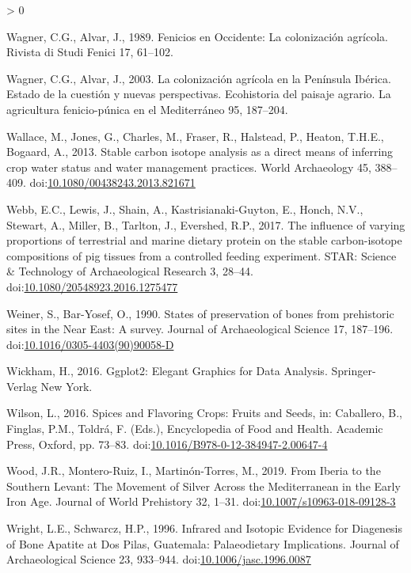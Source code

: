 \documentclass[5p]{elsarticle} %
\newlength{\cslhangindent}
\newenvironment{CSLReferences}[2] %
 {%
  \setlength{\parindent}{0pt}
  \ifodd #1 \everypar{\setlength{\hangindent}{\cslhangindent}}\ignorespaces\fi
  \ifnum #2 > 0
  \setlength{\parskip}{#2\baselineskip}
  \fi
 }%
 {}
\begin{document}
\begin{CSLReferences}{1}{0}
\leavevmode\hypertarget{ref-wagner_alvar89}{}%
Wagner, C.G., Alvar, J., 1989. Fenicios en {Occidente}: La colonización agrícola. Rivista di Studi Fenici 17, 61--102.

\leavevmode\hypertarget{ref-wagner_alvar03}{}%
Wagner, C.G., Alvar, J., 2003. La colonización agrícola en la {Península Ibérica}. {Estado} de la cuestión y nuevas perspectivas. Ecohistoria del paisaje agrario. La agricultura fenicio-púnica en el Mediterráneo 95, 187--204.

\leavevmode\hypertarget{ref-wallace_etal13}{}%
Wallace, M., Jones, G., Charles, M., Fraser, R., Halstead, P., Heaton, T.H.E., Bogaard, A., 2013. Stable carbon isotope analysis as a direct means of inferring crop water status and water management practices. World Archaeology 45, 388--409. doi:\href{https://doi.org/10.1080/00438243.2013.821671}{10.1080/00438243.2013.821671}

\leavevmode\hypertarget{ref-webb_etal17a}{}%
Webb, E.C., Lewis, J., Shain, A., Kastrisianaki-Guyton, E., Honch, N.V., Stewart, A., Miller, B., Tarlton, J., Evershed, R.P., 2017. The influence of varying proportions of terrestrial and marine dietary protein on the stable carbon-isotope compositions of pig tissues from a controlled feeding experiment. STAR: Science \& Technology of Archaeological Research 3, 28--44. doi:\href{https://doi.org/10.1080/20548923.2016.1275477}{10.1080/20548923.2016.1275477}

\leavevmode\hypertarget{ref-weiner_bar-yosef90}{}%
Weiner, S., Bar-Yosef, O., 1990. States of preservation of bones from prehistoric sites in the {Near East}: {A} survey. Journal of Archaeological Science 17, 187--196. doi:\href{https://doi.org/10.1016/0305-4403(90)90058-D}{10.1016/0305-4403(90)90058-D}

\leavevmode\hypertarget{ref-wickham16}{}%
Wickham, H., 2016. Ggplot2: {Elegant Graphics} for {Data Analysis}. {Springer-Verlag New York}.

\leavevmode\hypertarget{ref-wilson16}{}%
Wilson, L., 2016. Spices and {Flavoring Crops}: {Fruits} and {Seeds}, in: Caballero, B., Finglas, P.M., Toldrá, F. (Eds.), Encyclopedia of {Food} and {Health}. {Academic Press}, {Oxford}, pp. 73--83. doi:\href{https://doi.org/10.1016/B978-0-12-384947-2.00647-4}{10.1016/B978-0-12-384947-2.00647-4}

\leavevmode\hypertarget{ref-wood_etal19}{}%
Wood, J.R., Montero-Ruiz, I., Martinón-Torres, M., 2019. From {Iberia} to the {Southern Levant}: {The Movement} of {Silver Across} the {Mediterranean} in the {Early Iron Age}. Journal of World Prehistory 32, 1--31. doi:\href{https://doi.org/10.1007/s10963-018-09128-3}{10.1007/s10963-018-09128-3}

\leavevmode\hypertarget{ref-wright_schwarcz96}{}%
Wright, L.E., Schwarcz, H.P., 1996. Infrared and {Isotopic Evidence} for {Diagenesis} of {Bone Apatite} at {Dos Pilas}, {Guatemala}: {Palaeodietary Implications}. Journal of Archaeological Science 23, 933--944. doi:\href{https://doi.org/10.1006/jasc.1996.0087}{10.1006/jasc.1996.0087}

\end{CSLReferences}
\end{document}
